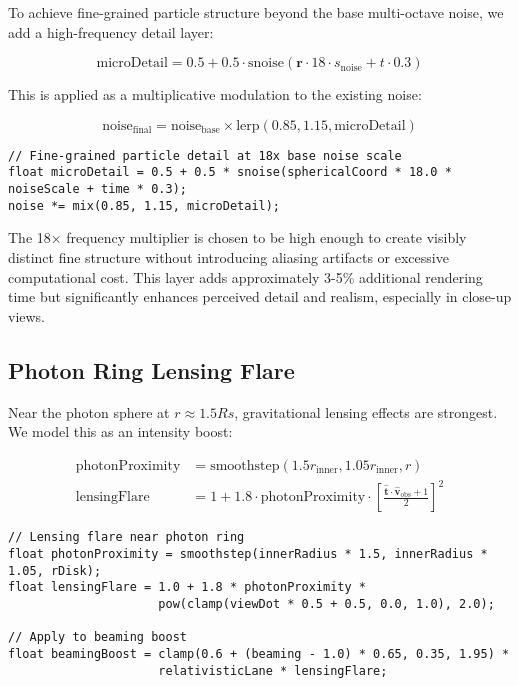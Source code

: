 \documentclass[12pt,a4paper]{article}
\theoremstyle{definition}
\theoremstyle{remark}
\begin{document}
To achieve fine-grained particle structure beyond the base multi-octave noise, we add a high-frequency detail layer:

\begin{equation}
    \text{microDetail} = 0.5 + 0.5 \cdot \text{snoise}(\mathbf{r} \cdot 18 \cdot s_{\text{noise}} + t \cdot 0.3)
\end{equation}

This is applied as a multiplicative modulation to the existing noise:

\begin{equation}
    \text{noise}_{\text{final}} = \text{noise}_{\text{base}} \times \text{lerp}(0.85, 1.15, \text{microDetail})
\end{equation}

\begin{lstlisting}[style=metalstyle, caption=Micro-turbulence detail]
// Fine-grained particle detail at 18x base noise scale
float microDetail = 0.5 + 0.5 * snoise(sphericalCoord * 18.0 * noiseScale + time * 0.3);
noise *= mix(0.85, 1.15, microDetail);
\end{lstlisting}

The 18× frequency multiplier is chosen to be high enough to create visibly distinct fine structure without introducing aliasing artifacts or excessive computational cost. This layer adds approximately 3-5\% additional rendering time but significantly enhances perceived detail and realism, especially in close-up views.

\subsection{Photon Ring Lensing Flare}

Near the photon sphere at $r \approx 1.5 Rs$, gravitational lensing effects are strongest. We model this as an intensity boost:

\begin{align}
    \text{photonProximity} &= \text{smoothstep}(1.5 r_{\text{inner}}, 1.05 r_{\text{inner}}, r) \\
    \text{lensingFlare} &= 1 + 1.8 \cdot \text{photonProximity} \cdot \left[\frac{\hat{\mathbf{t}} \cdot \hat{\mathbf{v}}_{\text{obs}} + 1}{2}\right]^2
\end{align}

\begin{lstlisting}[style=metalstyle, caption=Lensing flare near photon ring]
// Lensing flare near photon ring
float photonProximity = smoothstep(innerRadius * 1.5, innerRadius * 1.05, rDisk);
float lensingFlare = 1.0 + 1.8 * photonProximity * 
                     pow(clamp(viewDot * 0.5 + 0.5, 0.0, 1.0), 2.0);

// Apply to beaming boost
float beamingBoost = clamp(0.6 + (beaming - 1.0) * 0.65, 0.35, 1.95) * 
                     relativisticLane * lensingFlare;
\end{lstlisting}
\end{document}
